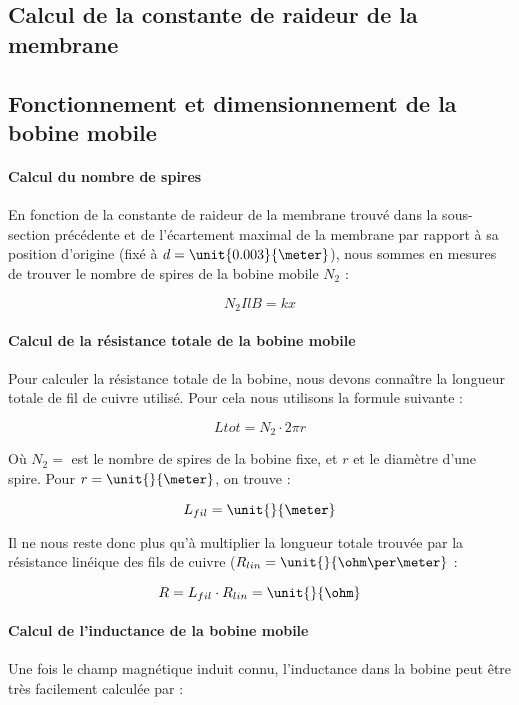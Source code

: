 \subsection{Calcul de la constante de raideur de la membrane}

\subsection{Fonctionnement et dimensionnement de la bobine mobile}

\paragraph{Calcul du nombre de spires}
En fonction de la constante de raideur de la membrane trouvé dans la sous-section précédente et de l'écartement
maximal de la membrane par rapport à sa position d'origine (fixé à $d = \unit{0.003}{\meter}$), nous sommes en
mesures de trouver le nombre de spires de la bobine mobile $N_2$ :

$$N_2IlB = kx$$


\paragraph{Calcul de la résistance totale de la bobine mobile}
Pour calculer la résistance totale de la bobine, nous devons connaître la longueur totale de fil de cuivre utilisé.
Pour cela nous utilisons la formule suivante :

$$L{tot} = N_2 \cdot 2\pi r$$

Où $N_2 = $ est le nombre de spires de la bobine fixe, et $r$ et le diamètre d'une spire. Pour
$r = \unit{}{\meter}$, on trouve :

$$L_{fil} = \unit{}{\meter}$$

Il ne nous reste donc plus qu'à multiplier la longueur totale trouvée par la résistance linéique des fils de cuivre
($R_{lin} = \unit{}{\ohm\per\meter}$ :

$$R = L_{fil} \cdot R_{lin} = \unit{}{\ohm}$$

\paragraph{Calcul de l'inductance de la bobine mobile}

Une fois le champ magnétique induit connu, l'inductance dans la bobine peut être très facilement calculée par :

